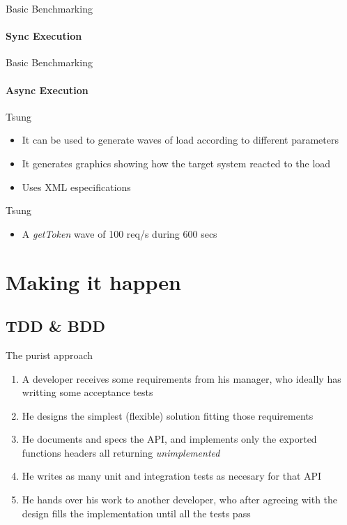 \documentclass[aspectratio=169]{beamer}
\begin{document}
\begin{frame}{Basic Benchmarking}
    \framesubtitle{Sync Execution}
    
\end{frame}

\begin{frame}{Basic Benchmarking}
    \framesubtitle{Async Execution}
    
\end{frame}

\begin{frame}{Tsung}
    \begin{itemize}
    \item It can be used to generate waves of load according to different parameters
    \item It generates graphics showing how the target system reacted to the load
    \item Uses XML especifications
    \end{itemize}
\end{frame}

\begin{frame}{Tsung}
    \begin{itemize}
    \item A \emph{getToken} wave of 100 req/s during 600 secs
    
    \end{itemize}
\end{frame}

\section{Making it happen}
\label{making_it_happen}

\subsection*{TDD \& BDD}
\label{tdd}

\begin{frame}{The purist approach}
    \begin{enumerate}
    \item A developer receives some requirements from his manager, who ideally has writting some acceptance tests
    \pause
    \item He designs the simplest (flexible) solution fitting those requirements
    \pause
    \item He documents and specs the API, and implements only the exported functions headers all returning \emph{unimplemented}
    \pause
    \item He writes as many unit and integration tests as necesary for that API
    \pause
    \item He hands over his work to another developer, who after agreeing with the design fills the implementation until
    all the tests pass
    \end{enumerate}
\end{frame}
\end{document}
